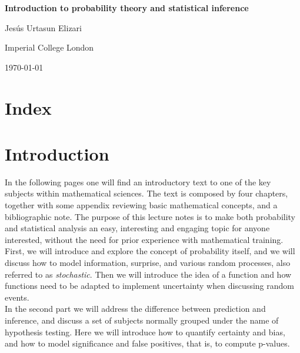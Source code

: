 \documentclass{book}
\begin{document}
\frontmatter

\begin{titlepage}
    \centering
    \vspace*{\fill}
    {\Huge\bfseries Introduction to probability theory and statistical inference\par}
    \vspace{1cm}
    {\Large Jes\'us Urtasun Elizari\par}
    \vspace{1cm}
     {\Large Imperial College London\par}
    \vspace{1cm}
    {\large\today\par}
    \vspace*{\fill}
\end{titlepage}

\tableofcontents

\chapter*{Index}
\printindex

\mainmatter


\chapter{Introduction}

\indent In the following pages one will find an introductory text to one of the key subjects within mathematical sciences. The text is composed by four chapters, together with some appendix reviewing basic mathematical concepts, and a bibliographic note. The purpose of this lecture notes is to make both probability and statistical analysis an easy, interesting and engaging topic for anyone interested, without the need for prior experience with mathematical training.\\

First, we will introduce and explore the concept of probability itself, and we will discuss how to model information, surprise, and various random processes, also referred to as \textit{stochastic}. Then we will introduce the idea of a function and how functions need to be adapted to implement uncertainty when discussing random events.\\

In the second part we will address the difference between prediction and inference, and discuss a set of subjects normally grouped under the name of hypothesis testing. Here we will introduce how to quantify certainty and bias, and how to model significance and false positives, that is, to compute p-values.\\
\end{document}
